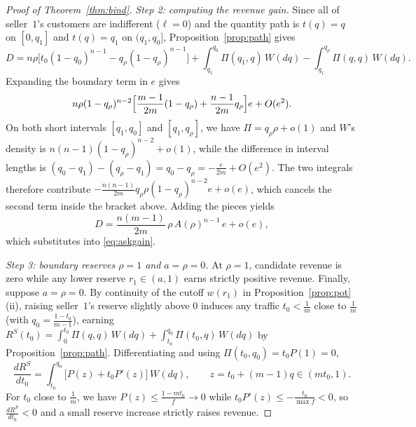 \documentclass[12pt]{article}
\theoremstyle{mystyle}
\theoremstyle{mystyle2}
\newcommand{\1}{\mathbf{1}}
\begin{document}
\begin{proof}[Proof of Theorem~\ref{thm:bind}]
\emph{Step 2: computing the revenue gain.} Since all of seller~$1$'s customers are indifferent ($\ell=0$) and the quantity path is $t(q)=q$ on $[0,q_1]$ and $t(q)=q_1$ on $(q_1,q_0]$, Proposition~\ref{prop:path} gives
\[
D = n\rho\bigl[t_0(1-q_0)^{n-1}-q_{\rho}(1-q_{\rho})^{n-1}\bigr] + \int_{q_1}^{q_0}\Pi(q_1,q)\,W(dq) - \int_{q_1}^{q_{\rho}}\Pi(q,q)\,W(dq).
\]
Expanding the boundary term in $e$ gives
\[
n\rho(1-q_{\rho})^{n-2}\Bigl[\frac{m-1}{2m}(1-q_{\rho})+\frac{n-1}{2m}q_{\rho}\Bigr]e + O(e^2).
\]
On both short intervals $[q_1,q_0]$ and $[q_1,q_{\rho}]$, we have $\Pi=q_{\rho}\rho+o(1)$ and $W$'s density is $n(n-1)(1-q_{\rho})^{n-2}+o(1)$, while the difference in interval lengths is $(q_0-q_1)-(q_{\rho}-q_1)=q_0-q_{\rho}=-\frac{e}{2m}+O(e^2)$. The two integrals therefore contribute $-\frac{n(n-1)}{2m}q_{\rho}\rho(1-q_{\rho})^{n-2}e+o(e)$, which cancels the second term inside the bracket above. Adding the pieces yields
\[
D = \frac{n(m-1)}{2m}\,\rho\,A(\rho)^{n-1}\,e + o(e),
\]
which substitutes into \eqref{eq:askgain}.

\emph{Step 3: boundary reserves $\rho=1$ and $a=\rho=0$.} At $\rho=1$, candidate revenue is zero while any lower reserve $r_1\in(a,1)$ earns strictly positive revenue. Finally, suppose $a=\rho=0$. By continuity of the cutoff $w(r_1)$ in Proposition~\ref{prop:pot}(ii), raising seller~$1$'s reserve slightly above $0$ induces any traffic $t_0<\frac{1}{m}$ close to $\frac{1}{m}$ (with $q_0=\frac{1-t_0}{m-1}$), earning $R^S(t_0)=\int_0^{t_0}\Pi(q,q)\,W(dq)+\int_{t_0}^{q_0}\Pi(t_0,q)\,W(dq)$ by Proposition~\ref{prop:path}. Differentiating and using $\Pi(t_0,q_0)=t_0 P(1)=0$,
\[
\frac{dR^S}{dt_0} = \int_{t_0}^{q_0}\bigl[P(z)+t_0 P'(z)\bigr]\,W(dq), \qquad z=t_0+(m-1)q\in(mt_0,1).
\]
For $t_0$ close to $\frac{1}{m}$, we have $P(z)\le\frac{1-mt_0}{\underline f}\to 0$ while $t_0 P'(z)\le-\frac{t_0}{\max f}<0$, so $\frac{dR^S}{dt_0}<0$ and a small reserve increase strictly raises revenue.
\end{proof}
\end{document}
